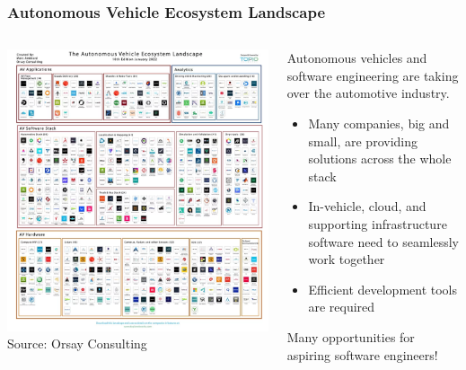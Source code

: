 \begin{frame}
\frametitle{Autonomous Vehicle Ecosystem Landscape}
\begin{columns}[]
    \begin{column}{0.4\textwidth}
        \centering
        \includegraphics[height=0.75\textheight]{images/av_ecosystem_landscape.png}\\
        \footnotesize{Source: Orsay Consulting\footnotemark[1]}        
    \end{column}
    \begin{column}{0.6\textwidth}
        Autonomous vehicles and software engineering are taking over the
        automotive industry.
        \begin{itemize}
            \item Many companies, big and small, are providing solutions across
                the whole stack
            \item In-vehicle, cloud, and supporting infrastructure software
                need to seamlessly work together
            \item Efficient development tools are required
        \end{itemize}
        \begin{block}{}
        Many opportunities for aspiring software engineers!
        \end{block}
    \end{column}
\end{columns}
\end{frame}